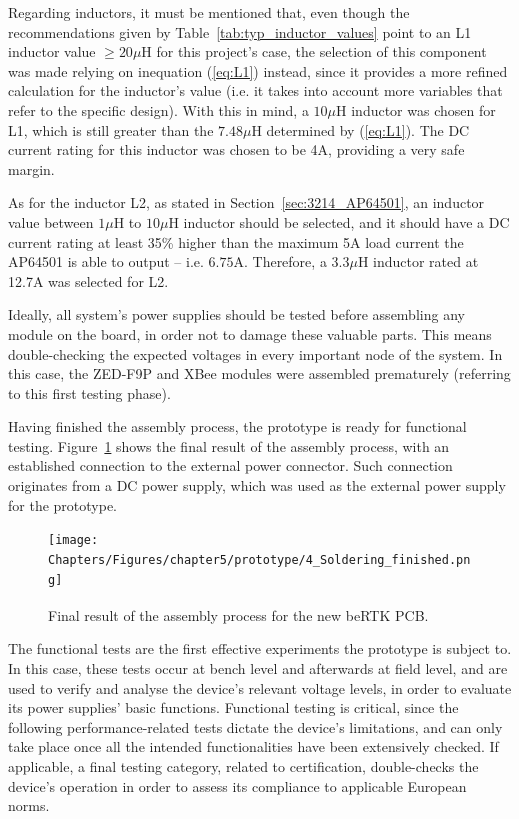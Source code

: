 Regarding inductors, it must be mentioned that, even though the recommendations given by Table~\ref{tab:typ_inductor_values} point to an L1 inductor value $\geq 20 \mu$H for this project's case, the selection of this component was made relying on inequation (\ref{eq:L1}) instead, since it provides a more refined calculation for the inductor's value (i.e. it takes into account more variables that refer to the specific design). With this in mind, a $10 \mu$H inductor was chosen for L1, which is still greater than the $7.48 \mu$H determined by (\ref{eq:L1}). The DC current rating for this inductor was chosen to be 4A, providing a very safe margin.

As for the inductor L2, as stated in Section~\ref{sec:3214_AP64501}, an inductor value between $1 \mu$H to $10 \mu$H inductor should be selected, and it should have a DC current rating at least 35\% higher than the maximum 5A load current the AP64501 is able to output -- i.e. $6.75$A. Therefore, a $3.3 \mu$H inductor rated at 12.7A was selected for L2.

Ideally, all system's power supplies should be tested before assembling any module on the board, in order not to damage these valuable parts. This means double-checking the expected voltages in every important node of the system. In this case, the ZED-F9P and XBee modules were assembled prematurely (referring to this first testing phase).

Having finished the assembly process, the prototype is ready for functional testing. Figure~\ref{fig:4_Soldering_finished} shows the final result of the assembly process, with an established connection to the external power connector.
Such connection originates from a DC power supply, which was used as the external power supply for the prototype.

\begin{figure}[h]
	\centering
	\texttt{[image: Chapters/Figures/chapter5/prototype/4\_Soldering\_finished.png]}
	\caption{Final result of the assembly process for the new beRTK\textsuperscript{\textregistered} PCB.}
	\label{fig:4_Soldering_finished}
\end{figure}%

The functional tests are the first effective experiments the prototype is subject to. In this case, these tests occur at bench level and afterwards at field level, and are used to verify and analyse the device's relevant voltage levels, in order to evaluate its power supplies' basic functions. Functional testing is critical, since the following performance-related tests dictate the device's limitations, and can only take place once all the intended functionalities have been extensively checked. If applicable, a final testing category, related to certification, double-checks the device's operation in order to assess its compliance to applicable European norms.

